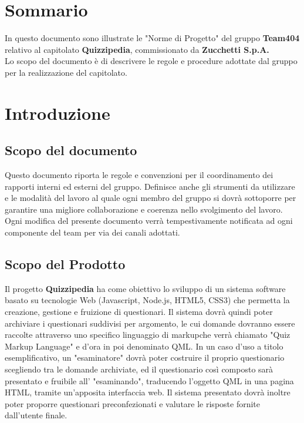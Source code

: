 \documentclass[a4paper,11pt]{article}
\begin{document}
	\listoffigures
	
	\newpage
	\section*{Sommario}
		In questo documento sono illustrate le "Norme di Progetto" del gruppo \textbf{Team404} relativo al capitolato \textbf{Quizzipedia}, commissionato da \textbf{Zucchetti S.p.A.} \\
		Lo scopo del documento è di descrivere le regole e procedure adottate dal gruppo per la realizzazione del capitolato. 
	\newpage
	\section{Introduzione}
	
		\subsection{Scopo del documento}
			Questo documento riporta le regole e convenzioni per il coordinamento dei rapporti interni ed esterni del gruppo. Definisce anche gli strumenti da utilizzare e le modalit\`a del lavoro al quale ogni membro del gruppo si dovr\`a sottoporre per garantire una migliore collaborazione e coerenza nello svolgimento del lavoro.\\
		Ogni modifica del presente documento  verr\`a tempestivamente notificata ad ogni componente del team per via dei canali adottati.
		\subsection{Scopo del Prodotto}
			Il progetto \textbf{Quizzipedia} ha come obiettivo lo sviluppo di un sistema software basato su tecnologie Web (Javascript\addglos, Node.js\addglos, HTML5\addglos, CSS3\addglos) che permetta la creazione, gestione e fruizione di questionari. Il sistema dovrà quindi poter archiviare i questionari suddivisi per argomento, le cui domande dovranno essere raccolte attraverso uno specifico linguaggio di markup\addglos che verrà chiamato "Quiz Markup Language" e d'ora in poi denominato QML\addglos. In un caso d'uso a titolo esemplificativo, un "esaminatore" dovrà poter costruire il proprio questionario scegliendo tra le domande archiviate, ed il questionario così composto sarà presentato e fruibile all' "esaminando", traducendo l'oggetto QML in una pagina HTML\addglos, tramite un'apposita interfaccia web. Il sistema presentato dovrà inoltre poter proporre questionari preconfezionati e valutare le risposte fornite dall'utente finale.	\\
\end{document}
